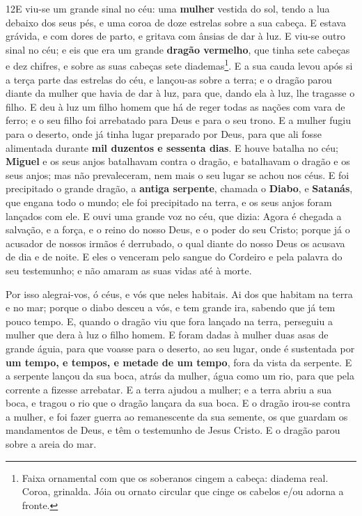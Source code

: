 \medskip

\lettrine{12} E viu-se um grande sinal no céu: uma
\textbf{mulher} vestida do sol, tendo a lua debaixo dos seus pés, e
uma coroa de doze estrelas sobre a sua cabeça. E estava grávida,
e com dores de parto, e gritava com ânsias de dar à luz. E
viu-se outro sinal no céu; e eis que era um grande \textbf{dragão
vermelho}, que tinha sete cabeças e dez chifres, e sobre as suas
cabeças sete diademas\footnote{Faixa ornamental com que os soberanos
cingem a cabeça: diadema real. Coroa, grinalda. Jóia ou ornato
circular que cinge os cabelos e/ou adorna a fronte.}. E a sua
cauda levou após si a terça parte das estrelas do céu, e lançou-as
sobre a terra; e o dragão parou diante da mulher que havia de dar à
luz, para que, dando ela à luz, lhe tragasse o filho. E deu à
luz um filho homem que há de reger todas as nações com vara de
ferro; e o seu filho foi arrebatado para Deus e para o seu trono.
E a mulher fugiu para o deserto, onde já tinha lugar preparado
por Deus, para que ali fosse alimentada durante \textbf{mil duzentos
e sessenta dias}. E houve batalha no céu; \textbf{Miguel} e os
seus anjos batalhavam contra o dragão, e batalhavam o dragão e os
seus anjos; mas não prevaleceram, nem mais o seu lugar se achou
nos céus. E foi precipitado o {grande dragão}, a \textbf{antiga
serpente}, chamada o \textbf{Diabo}, e \textbf{Satanás}, que engana
todo o mundo; ele foi precipitado na terra, e os seus anjos foram
lançados com ele. E ouvi uma grande voz no céu, que dizia:
Agora é chegada a salvação, e a força, e o reino do nosso Deus, e o
poder do seu Cristo; porque já o acusador de nossos irmãos é
derrubado, o qual diante do nosso Deus os acusava de dia e de noite.
E eles o venceram pelo sangue do Cordeiro e pela palavra do
seu testemunho; e não amaram as suas vidas até à morte.

Por isso alegrai-vos, ó céus, e vós que neles habitais. Ai dos
que habitam na terra e no mar; porque o diabo desceu a vós, e tem
grande ira, sabendo que já tem pouco tempo. E, quando o
dragão viu que fora lançado na terra, perseguiu a mulher que dera à
luz o filho homem. E foram dadas à mulher duas asas de grande
águia, para que voasse para o deserto, ao seu lugar, onde é
sustentada por \textbf{um tempo, e tempos, e metade de um tempo},
fora da vista da serpente. E a serpente lançou da sua boca,
atrás da mulher, água como um rio, para que pela corrente a fizesse
arrebatar. E a terra ajudou a mulher; e a terra abriu a sua
boca, e tragou o rio que o dragão lançara da sua boca. E o
dragão irou-se contra a mulher, e foi fazer guerra ao remanescente
da sua semente, os que guardam os mandamentos de Deus, e têm o
testemunho de Jesus Cristo. E o dragão parou sobre a areia do
mar.

